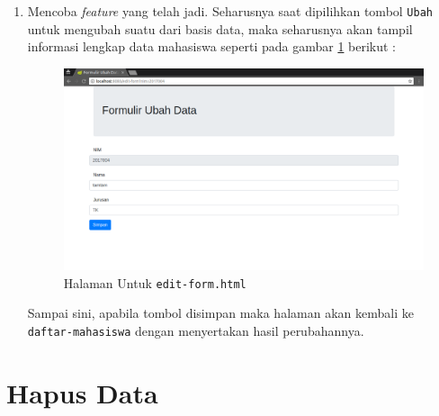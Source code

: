 \begin{enumerate}
\begin{lstlisting}
@Configuration
public class WebConfig extends WebMvcConfigurerAdapter {

	@Override
	public void addViewControllers(ViewControllerRegistry registry) {
		registry.addViewController("/login").setViewName("login");
		registry.addViewController("/test-angular").setViewName("test-angular");
        registry.addViewController("/").setViewName("daftar-mahasiswa");
        registry.addViewController("/daftar-mahasiswa").setViewName("daftar-mahasiswa");
        registry.addViewController("/form").setViewName("form");
        (*\texttt{registry.addViewController("/edit-form").setViewName("edit-form"); }*)
	}

}
	\end{lstlisting}
	
	\item Mencoba \textit{feature} yang telah jadi. Seharusnya saat dipilihkan tombol \texttt{Ubah} untuk mengubah suatu dari basis data, maka seharusnya akan tampil informasi lengkap data mahasiswa seperti pada gambar \ref{fig:halaman-edit-data} berikut :
	
	\begin{figure}[H]
		\centering
		\includegraphics[width=1.0\textwidth]{./resources/036-tampilan-edit-form}
		\caption{Halaman Untuk \texttt{edit-form.html}}
		\label{fig:halaman-edit-data}
	\end{figure}
	
	Sampai sini, apabila tombol disimpan maka halaman akan kembali ke \texttt{daftar-mahasiswa} dengan menyertakan hasil perubahannya.
\end{enumerate}
	

\section{Hapus Data}

